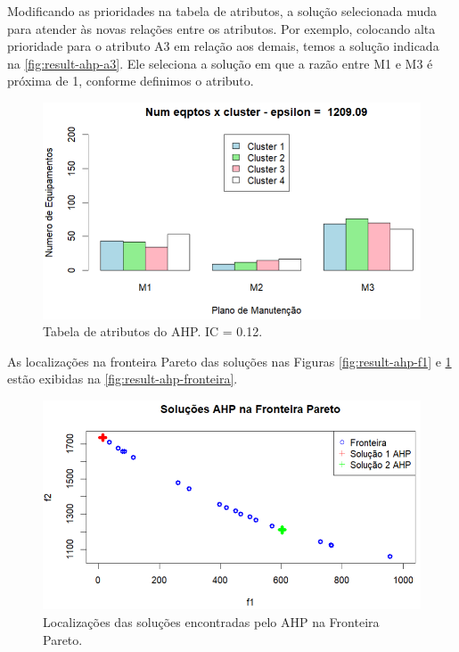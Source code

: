 \documentclass[conference]{IEEEtran}
\begin{document}
Modificando as prioridades na tabela de atributos, a solução selecionada muda para atender 
às novas relações entre os atributos. Por exemplo, colocando alta prioridade para o atributo A3 
em relação aos demais, temos a solução indicada na \autoref{fig:result-ahp-a3}. Ele seleciona a solução 
em que a razão entre M1 e M3 é próxima de 1, conforme definimos o atributo.

\begin{figure}[htbp]
    \centering
    \includegraphics[width=\columnwidth,trim=1 1 1 1,clip]{../images/result-ahp-a3.png}
    \caption{\label{fig:result-ahp-a3}
	Tabela de atributos do AHP. IC = 0.12.}
\end{figure}

As localizações na fronteira Pareto das soluções nas Figuras \ref{fig:result-ahp-f1}
e \ref{fig:result-ahp-a3} estão exibidas na \autoref{fig:result-ahp-fronteira}.

\begin{figure}[htbp]
    \centering
    \includegraphics[width=\columnwidth,trim=1 1 1 1,clip]{../images/result-ahp-fronteira.png}
    \caption{\label{fig:result-ahp-fronteira}
	Localizações das soluções encontradas pelo AHP na Fronteira Pareto.}
\end{figure}
\end{document}
